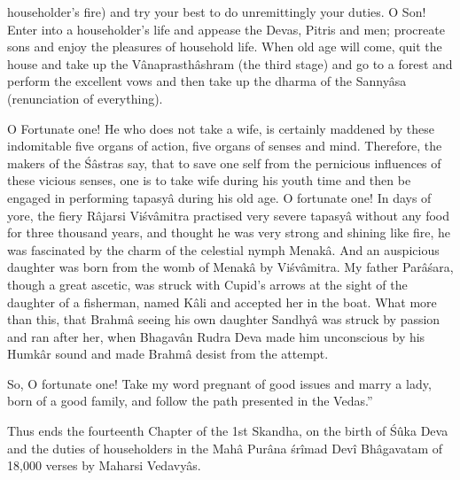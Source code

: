 householder's fire) and try your best to do unremittingly your duties. O Son! Enter into a householder's life and appease the Devas, Pitris and men; procreate sons and enjoy the pleasures of household life. When old age will come, quit the house and take up the V\^anaprasth\^ashram (the third stage) and go to a forest and perform the excellent vows and then take up the dharma of the Sanny\^asa (renunciation of everything).

O Fortunate one! He who does not take a wife, is certainly maddened by these indomitable five organs of action, five organs of senses and mind. Therefore, the makers of the \'S\^astras say, that to save one self from the pernicious influences of these vicious senses, one is to take wife during his youth time and then be engaged in performing tapasy\^a during his old age. O fortunate one! In days of yore, the fiery R\^ajarsi Vi\'sv\^amitra practised very severe tapasy\^a without any food for three thousand years, and thought he was very strong and shining like fire, he was fascinated by the charm of the celestial nymph Menak\^a. And an auspicious daughter was born from the womb of Menak\^a by Vi\'sv\^amitra. My father Par\^a\'sara, though a great ascetic, was struck with Cupid's arrows at the sight of the daughter of a fisherman, named K\^ali and accepted her in the boat. What more than this, that Brahm\^a seeing his  own daughter Sandhy\^a was struck by passion and ran after her, when Bhagav\^an Rudra Deva made him unconscious by his Humk\^ar sound and made Brahm\^a desist from the attempt.

So, O fortunate one! Take my word pregnant of good issues and marry a lady, born of a good family, and follow the path presented in the Vedas.''

Thus ends the fourteenth Chapter of the 1st Skandha, on the birth of \'S\^uka Deva and the duties of householders in the Mah\^a Pur\^ana \'sr\^imad Dev\^i Bh\^agavatam of 18,000 verses by Maharsi Vedavy\^as.

